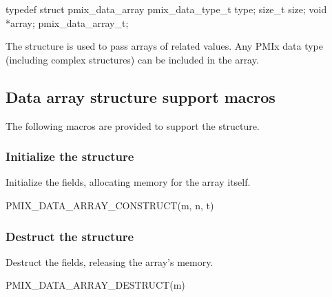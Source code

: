 \cspecificstart
\begin{codepar}
typedef struct pmix_data_array {
    pmix_data_type_t type;
    size_t size;
    void *array;
} pmix_data_array_t;
\end{codepar}
\cspecificend

The  structure is used to pass arrays of related values. Any \ac{PMIx} data type (including complex structures) can be included in the array.

\subsection{Data array structure support macros}
The following macros are provided to support the  structure.

\subsubsection{Initialize the  structure}

Initialize the  fields, allocating memory for the array itself.

\cspecificstart
\begin{codepar}
PMIX_DATA_ARRAY_CONSTRUCT(m, n, t)
\end{codepar}
\cspecificend

\begin{arglist}
\end{arglist}

\subsubsection{Destruct the  structure}

Destruct the  fields, releasing the array's memory.

\cspecificstart
\begin{codepar}
PMIX_DATA_ARRAY_DESTRUCT(m)
\end{codepar}
\cspecificend

